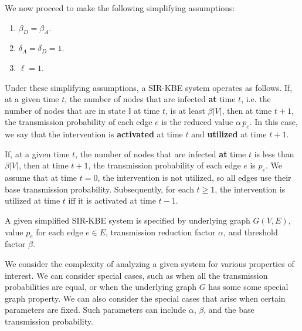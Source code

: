 \documentclass[11pt]{article}
\newcommand{\istate}{\mbox{$\mathbb{I}$}}
\begin{document}
\iffalse
\begin{description}
\item[transmission reduction factor] $\alpha$.
\item[activation threshold] $\beta_A$.
\item[deactivation threshold] $\beta_D$.
\item[activation delay] $\delta_A$.
\item[deactivation delay] $\delta_D$.
\item[intervention length] $\ell$.
\end{description}

We require that $0 < \alpha < 1$, $0 < \beta_D \leq \beta_A < 1$,
$\delta_A \geq 0$, $\delta_D \geq 0$, and $\ell \geq 1$.
\fi

We now proceed to make the following simplifying assumptions:

\begin{enumerate}
\item
$\beta_D = \beta_A$.
\item
$\delta_A = \delta_D = 1$.
\item
$\ell = 1$.
\end{enumerate}

Under these simplifying assumptions, a SIR-KBE system operates as follows.
If, at a given time $t$, the number of nodes that are infected {\bf at} time $t$,
i.e. the number of nodes that are in state $\istate$ at time $t$,
 is at least $\beta |V|$,
then at time $t+1$, the transmission probability of each edge $e$ 
is the reduced value $\alpha \, p_e$.
In this case, 
we say that the intervention is {\bf activated} at time $t$ and {\bf utilized} at time $t+1$.

If, at a given time $t$, the number of nodes that are infected {\bf at} time $t$
is less than $\beta |V|$,
then at time $t+1$, the transmission probability of each edge $e$ is  $p_e$.
We assume that at time $t=0$, the intervention is not utilized, 
so all edges use their base transmission probability.
Subsequently, for each $t \geq 1$,
the intervention is utilized at time $t$ iff it is activated at time $t-1$.


A given simplified SIR-KBE system is specified by underlying graph $G(V,E)$, 
value $p_e$ for each edge $e \in E$,
transmission reduction factor $\alpha$, and threshold factor $\beta$.



We consider the complexity of analyzing a given system for various properties of interest.
We can consider special cases, such as when all the transmission probabilities are equal,
or when the underlying graph $G$ has some some special graph property.
We can also consider the special cases that arise when certain parameters are fixed.
Such parameters can include $\alpha$, $\beta$, and the base transmission probability.
\end{document}
